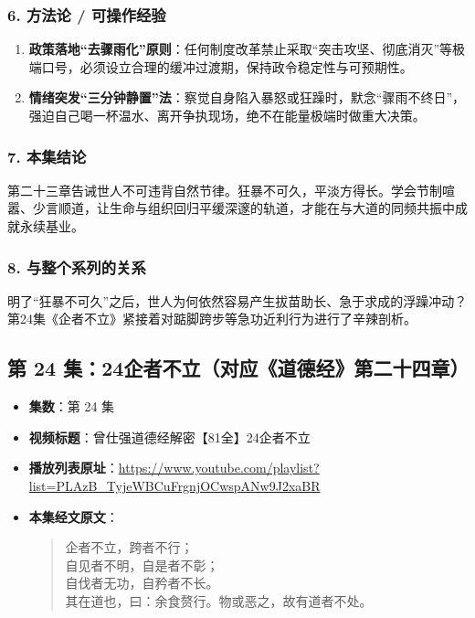 \subsubsection{6. 方法论 / 可操作经验}
\begin{enumerate}
    \item \textbf{政策落地“去骤雨化”原则}：任何制度改革禁止采取“突击攻坚、彻底消灭”等极端口号，必须设立合理的缓冲过渡期，保持政令稳定性与可预期性。
    \item \textbf{情绪突发“三分钟静置”法}：察觉自身陷入暴怒或狂躁时，默念“骤雨不终日”，强迫自己喝一杯温水、离开争执现场，绝不在能量极端时做重大决策。
\end{enumerate}

\subsubsection{7. 本集结论}
第二十三章告诫世人不可违背自然节律。狂暴不可久，平淡方得长。学会节制喧嚣、少言顺道，让生命与组织回归平缓深邃的轨道，才能在与大道的同频共振中成就永续基业。

\subsubsection{8. 与整个系列的关系}
明了“狂暴不可久”之后，世人为何依然容易产生拔苗助长、急于求成的浮躁冲动？第24集《企者不立》紧接着对踮脚跨步等急功近利行为进行了辛辣剖析。

\clearpage

\subsection{第 24 集：24企者不立（对应《道德经》第二十四章）}
\label{sec:ep24}

\begin{itemize}
    \item \textbf{集数}：第 24 集
    \item \textbf{视频标题}：曾仕强道德经解密【81全】24企者不立
    \item \textbf{播放列表原址}：\url{https://www.youtube.com/playlist?list=PLAzB_TyjeWBCuFrgnjOCwspANw9J2xaBR}
    \item \textbf{本集经文原文}：
    \begin{quote}\kaishu
    企者不立，跨者不行；\\
    自见者不明，自是者不彰；\\
    自伐者无功，自矜者不长。\\
    其在道也，曰：余食赘行。物或恶之，故有道者不处。
    \end{quote}
\end{itemize}


